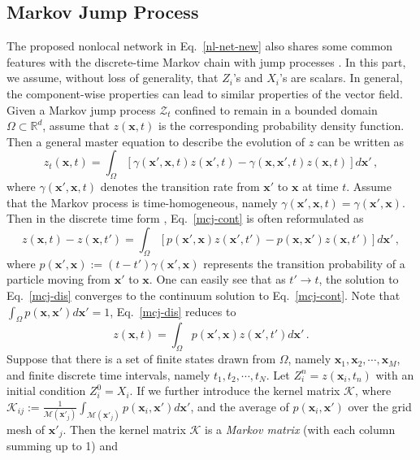 \documentclass{article}
\newcommand{\xb}{\bm{x}}
\begin{document}
\subsection{Markov Jump Process}
The proposed nonlocal network in Eq.~\eqref{nl-net-new} also shares some common features with the discrete-time Markov chain with jump processes \cite{du2012analysis}. In this part, we assume, without loss of generality, that $Z_i$'s and $X_i$'s are scalars. In general, the component-wise properties can lead to similar properties of the vector field. Given a Markov jump process $\mathcal{Z}_t$ confined to remain in a bounded domain $\Omega\subset\mathbb{R}^d$, assume that $z(\xb,t)$ is the corresponding probability density function. Then a general master equation to describe the evolution of $z$ \cite{kenkre1973generalized} can be written as
\begin{equation}\label{mcj-cont}
z_t(\xb,t) = \int_\Omega \left[ \gamma(\xb',\xb,t)z(\xb',t)-\gamma(\xb,\xb',t)z(\xb,t)\right] d\xb'\,,
\end{equation}
where $\gamma(\xb',\xb,t)$ denotes the transition rate from $\xb'$ to $\xb$ at time $t$. Assume that the Markov process is time-homogeneous, namely $\gamma(\xb',\xb,t)=\gamma(\xb',\xb)$. Then in the discrete time form \cite{zhao2016generalized}, Eq.~\eqref{mcj-cont} is often reformulated as 
\begin{equation}\label{mcj-dis}
z(\xb,t)-z(\xb,t')=\int_\Omega \left[ p(\xb',\xb)z(\xb',t') -p(\xb,\xb')z(\xb,t')\right] d\xb'\,,
\end{equation}
where $p(\xb',\xb):=(t-t')\gamma(\xb',\xb)$ represents the transition probability of a particle moving from $\xb'$ to $\xb$. One can easily see that as $t'\to t$, the solution to Eq.~\eqref{mcj-dis} converges to the continuum solution to Eq.~\eqref{mcj-cont}. Note that 
$
\int_\Omega p(\xb,\xb') d\xb'=1
$, Eq.~\eqref{mcj-dis} reduces to
\begin{equation}
z(\xb,t)=\int_\Omega p(\xb',\xb)z(\xb',t') d\xb'\,.
\end{equation}
Suppose that there is a set of finite states drawn from $\Omega$, namely $\xb_1,\xb_2,\cdots,\xb_M$, and finite discrete time intervals, namely $t_1,t_2,\cdots, t_N$. Let $Z_i^n = z(\xb_i,t_n)$ with an initial condition $Z_i^0=X_i$. If we further introduce the kernel matrix $\mathcal{K}$, where $\mathcal{K}_{ij}:=\frac{1}{\mathcal{M}(\xb'_j)}\int_{\mathcal{M}(\xb'_j)} p(\xb_i, \xb')d\xb'$,  and the average of $p(\xb_i,\xb')$ over the grid mesh of $\xb'_j$. Then the kernel matrix $\mathcal{K}$ is a \textit{Markov matrix} (with each column summing up to 1) and
\end{document}
